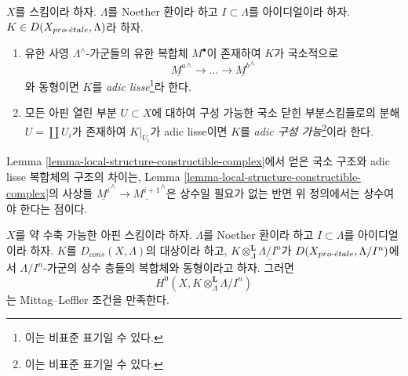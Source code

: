 \begin{definition}
\label{definition-adic-constructible}
$X$를 스킴이라 하자. $\Lambda$를 Noether 환이라 하고
$I \subset \Lambda$를 아이디얼이라 하자.
$K \in D(X_{pro\text{-}\acute{e}tale}, \Lambda)$라 하자.
\begin{enumerate}
\item 유한 사영 $\Lambda^\wedge$-가군들의 유한 복합체 $M^\bullet$이
존재하여 $K$가 국소적으로
$$
\underline{M^a}^\wedge \to \ldots \to \underline{M^b}^\wedge
$$
와 동형이면 $K$를 {\it adic lisse}\footnote{이는 비표준 표기일 수
있다.}라 한다.
\item 모든 아핀 열린 부분 $U \subset X$에 대하여 구성 가능한 국소
닫힌 부분스킴들로의 분해 $U = \coprod U_i$가 존재하여
$K|_{U_i}$가 adic lisse이면 $K$를 {\it adic 구성 가능}\footnote{이는
비표준 표기일 수 있다.}이라 한다.
\end{enumerate}
\end{definition}

\noindent
Lemma \ref{lemma-local-structure-constructible-complex}에서 얻은 국소
구조와 adic lisse 복합체의 구조의 차이는, Lemma
\ref{lemma-local-structure-constructible-complex}의 사상들
$\underline{M^i}^\wedge \to \underline{M^{i + 1}}^\wedge$은 상수일
필요가 없는 반면 위 정의에서는 상수여야 한다는 점이다.

\begin{lemma}
\label{lemma-weakly-contractible-locally-constant-ML}
$X$를 약 수축 가능한 아핀 스킴이라 하자. $\Lambda$를 Noether 환이라
하고 $I \subset \Lambda$를 아이디얼이라 하자. $K$를
$D_{cons}(X, \Lambda)$의 대상이라 하고,
$K \otimes_\Lambda^\mathbf{L} \underline{\Lambda/I^n}$가
$D(X_{pro\text{-}\acute{e}tale}, \Lambda/I^n)$에서 $\Lambda/I^n$-가군의 상수 층들의
복합체와 동형이라고 하자. 그러면
$$
H^0(X, K \otimes_\Lambda^\mathbf{L} \Lambda/I^n)
$$
는 Mittag--Leffler 조건을 만족한다.
\end{lemma}

